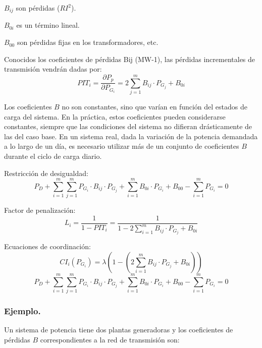 				$B_{ij}$ son pérdidas ($RI^2$).
				
				$B_{0i}$ es un término lineal.
				
				$B_{00}$ son pérdidas fijas en los transformadores, etc.
				
				
				\vspace{0.25cm}
				Conocidos los coeficientes de pérdidas Bij (MW-1), las pérdidas incrementales de transmisión vendrán dadas por:
				\[PIT_i = \dfrac{\partial P_p}{\partial P_{G_i}} = 2 \sum_{j=1}^{m} B_{ij} \cdot P_{G_j} + B_{0i}\]
				
				
				Los coeficientes $B$ no son constantes, sino que varían en función del estados de carga del sistema. En la práctica, estos coeficientes pueden considerarse constantes, siempre que las condiciones del sistema no difieran drásticamente de las del caso base. En un sistema real, dada la variación de la potencia demandada a lo largo de un día, es necesario utilizar más de un conjunto de coeficientes $B$ durante el ciclo de carga diario.
				
				
				\vspace{0.25cm}
				Restricción de desigualdad:
				\[P_D + \sum_{i=1}^{m}\sum_{j=1}^{m}  P_{G_i}\cdot B_{ij} \cdot P_{G_j} + \sum_{i=1}^{m} B_{0i} \cdot P_{G_i} + B_{00} - \sum_{i=1}^{m} P_{G_i} = 0\]
				
				
				\vspace{0.25cm}
				Factor de penalización:
				\[L_i = \dfrac{1}{1-PIT_i} = \dfrac{1}{1-2 \sum\limits_{i=1}^{m} B_{ij} \cdot P_{G_j} + B_{0i}}\]
				
				
				\vspace{0.25cm}
				Ecuaciones de coordinación:
				\[CI_i(P_{G_i}) = \lambda \left(1 - \left(2 \sum\limits_{i=1}^{m} B_{ij} \cdot P_{G_j} + B_{0i} \right) \right)\]
				\[P_D + \sum_{i=1}^{m}\sum_{j=1}^{m}  P_{G_i}\cdot B_{ij} \cdot P_{G_j} + \sum_{i=1}^{m} B_{0i} \cdot P_{G_i} + B_{00} - \sum_{i=1}^{m} P_{G_i} = 0\]
				
				
			\subsubsection*{Ejemplo.}
				Un sistema de potencia tiene dos plantas generadoras y los coeficientes de pérdidas $B$ correspondientes a la red de transmisión son:
				
